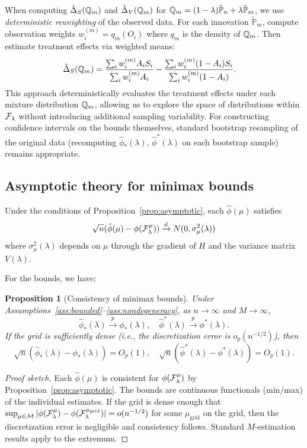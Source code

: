 \documentclass{article}
\newtheorem{proposition}{Proposition}
\newcommand{\PP}{\mathbb{P}}
\begin{document}
When computing $\hat{\Delta}_S(\mathbb{Q}_m)$ and $\hat{\Delta}_Y(\mathbb{Q}_m)$ for $\Q_m = (1-\lambda)\hat{\PP}_n + \lambda\tilde{\PP}_m$, we use \emph{deterministic reweighting} of the observed data. For each innovation $\tilde{\PP}_m$, compute observation weights $w_i^{(m)} = q_m(O_i)$ where $q_m$ is the density of $\mathbb{Q}_m$. Then estimate treatment effects via weighted means:
\begin{align*}
    \hat{\Delta}_S(\mathbb{Q}_m) &= \frac{\sum_i w_i^{(m)} A_i S_i}{\sum_i w_i^{(m)} A_i} - \frac{\sum_i w_i^{(m)} (1-A_i) S_i}{\sum_i w_i^{(m)} (1-A_i)}.
\end{align*}
This approach deterministically evaluates the treatment effects under each mixture distribution $\mathbb{Q}_m$, allowing us to explore the space of distributions within $\mathcal{F}_\lambda$ without introducing additional sampling variability. For constructing confidence intervals on the bounds themselves, standard bootstrap resampling of the original data (recomputing $\hat{\phi}_*(\lambda)$, $\hat{\phi}^*(\lambda)$ on each bootstrap sample) remains appropriate.

\subsection{Asymptotic theory for minimax bounds}

Under the conditions of Proposition~\ref{prop:asymptotic}, each $\hat{\phi}(\mu)$ satisfies
\[
    \sqrt{n}(\hat{\phi}(\mu) - \phi(\mathcal{F}_\lambda^\mu)) \xrightarrow{d} N(0, \sigma^2_\mu(\lambda))
\]
where $\sigma^2_\mu(\lambda)$ depends on $\mu$ through the gradient of $H$ and the variance matrix $V(\lambda)$.

For the bounds, we have:

\begin{proposition}[Consistency of minimax bounds]\label{prop:minimax-consistency}
Under Assumptions~\ref{ass:bounded}--\ref{ass:nondegeneracy}, as $n \to \infty$ and $M \to \infty$,
\[
    \hat{\phi}_*(\lambda) \xrightarrow{p} \phi_*(\lambda), \quad \hat{\phi}^*(\lambda) \xrightarrow{p} \phi^*(\lambda).
\]
If the grid is sufficiently dense (i.e., the discretization error is $o_p(n^{-1/2})$), then
\[
    \sqrt{n}(\hat{\phi}_*(\lambda) - \phi_*(\lambda)) = O_p(1), \quad \sqrt{n}(\hat{\phi}^*(\lambda) - \phi^*(\lambda)) = O_p(1).
\]
\end{proposition}

\begin{proof}[Proof sketch]
Each $\hat{\phi}(\mu)$ is consistent for $\phi(\mathcal{F}_\lambda^\mu)$ by Proposition~\ref{prop:asymptotic}. The bounds are continuous functionals (min/max) of the individual estimates. If the grid is dense enough that $\sup_{\mu \in \mathcal{M}} |\phi(\mathcal{F}_\lambda^\mu) - \phi(\mathcal{F}_\lambda^{\mu_{\text{grid}}})| = o(n^{-1/2})$ for some $\mu_{\text{grid}}$ on the grid, then the discretization error is negligible and consistency follows. Standard $M$-estimation results apply to the extremum.
\end{proof}
\end{document}
